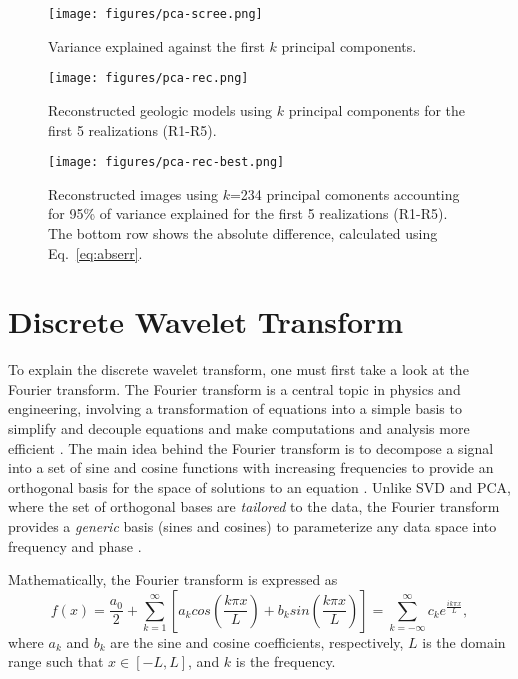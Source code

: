 \documentclass[a4paper,fleqn,12pt]{article}
\begin{document}
\begin{figure}[H]
    \centering
    \texttt{[image: figures/pca-scree.png]}
    \caption{Variance explained against the first $k$ principal components.}
    \label{fig:pca-scree}
\end{figure}

\begin{figure}[H]
    \centering
    \texttt{[image: figures/pca-rec.png]}
    \caption{Reconstructed geologic models using $k$ principal components for the first 5 realizations (R1-R5).}
    \label{fig:pca-rec}
\end{figure}

\begin{figure}[H]
    \centering
    \texttt{[image: figures/pca-rec-best.png]}
    \caption{Reconstructed images using $k$=234 principal comonents accounting for 95\% of variance explained for the first 5 realizations (R1-R5). The bottom row shows the absolute difference, calculated using Eq.~\ref{eq:abserr}.}
    \label{fig:pca-rec-best}
\end{figure}

\pagebreak
\section*{Discrete Wavelet Transform}

To explain the discrete wavelet transform, one must first take a look at the Fourier transform. The Fourier transform is a central topic in physics and engineering, involving a transformation of equations into a simple basis to simplify and decouple equations and make computations and analysis more efficient \cite{duhamel1990fast, li2020fourier}. The main idea behind the Fourier transform is to decompose a signal into a set of sine and cosine functions with increasing frequencies to provide an orthogonal basis for the space of solutions to an equation \cite{iorio2001fourier}. Unlike SVD and PCA, where the set of orthogonal bases are \emph{tailored} to the data, the Fourier transform provides a \emph{generic} basis (sines and cosines) to parameterize any data space into frequency and phase \cite{brunton2022data}.

Mathematically, the Fourier transform is expressed as
\begin{equation}
    f(x) = \frac{a_0}{2} + 
    \sum_{k=1}^\infty [a_k cos(\frac{k\pi x}{L}) + b_k sin(\frac{k\pi x}{L})] 
    = \sum_{k=-\infty}^{\infty} c_k e^{\frac{ik\pi x}{L}} ,
\end{equation}
where $a_k$ and $b_k$ are the sine and cosine coefficients, respectively, $L$ is the domain range such that $x\in[-L,L]$, and $k$ is the frequency.
\end{document}
